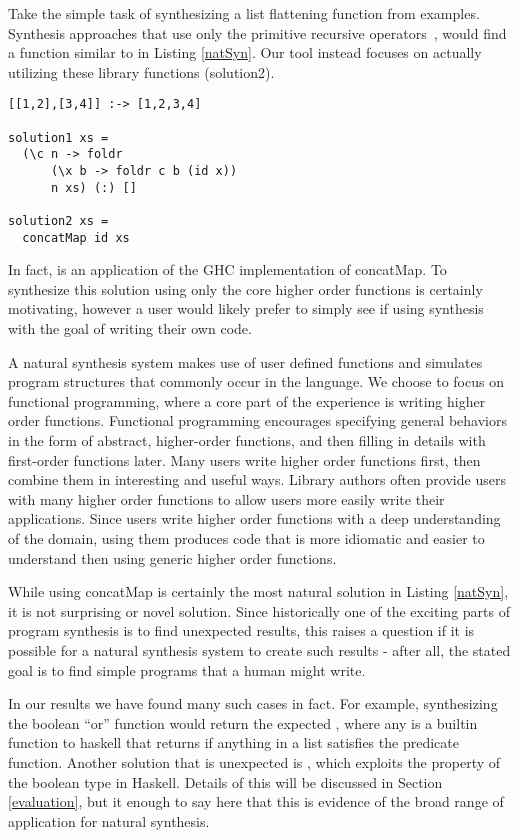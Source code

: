 Take the simple task of synthesizing a list flattening function from examples. 
Synthesis approaches that use only the primitive recursive operators~\cite{poseraZ15,FeserCD15}, would find a function similar to  in Listing \ref{natSyn}.
Our tool instead focuses on actually utilizing these library functions (solution2).

\begin{lstlisting}[caption=Low-level synthesis vs. Natural synthesis,label=natSyn]
[[1,2],[3,4]] :-> [1,2,3,4]

solution1 xs = 
  (\c n -> foldr 
      (\x b -> foldr c b (id x))
      n xs) (:) []
      
solution2 xs =
  concatMap id xs
\end{lstlisting}

\noindent In fact,  is an application of the GHC\cite{ghc} implementation of concatMap. To synthesize this solution using only the core higher order functions is certainly motivating, however a user would likely prefer to simply see  if using synthesis with the goal of writing their own code.

A natural synthesis system makes use of user defined functions and simulates program structures that commonly occur in the language.  
We choose to focus on functional programming, where a core part of the experience is writing higher order functions.  
Functional programming encourages specifying general behaviors in the form of abstract, higher-order functions, and then filling in details with first-order functions later.
Many users write higher order functions first, then combine them in interesting and useful ways.
Library authors often provide users with many higher order functions to allow users more easily write their applications.
Since users write higher order functions with a deep understanding of the domain, using them produces code that is more idiomatic and easier to understand then using generic higher order functions.

While using concatMap is certainly the most natural solution in Listing \ref{natSyn}, it is not surprising or novel solution. 
Since historically one of the exciting parts of program synthesis is to find unexpected results, this raises a question if it is possible for a natural synthesis system to create such results - after all, the stated goal is to find simple programs that a human might write.

In our results we have found many such cases in fact. 
For example, synthesizing the boolean ``or'' function would return the expected , where any is a builtin function to haskell that returns  if anything in a list satisfies the predicate function. 
Another solution that is unexpected is , which exploits the  property of the boolean type in Haskell. 
Details of this will be discussed in Section \ref{evaluation}, but it enough to say here that this is evidence of the broad range of application for natural synthesis.

